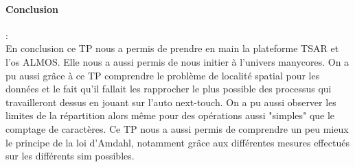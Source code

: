 \paragraph{Conclusion }:\\
En conclusion ce TP nous a permis de prendre en main la plateforme TSAR et l'os ALMOS. Elle nous a aussi permis de nous initier à l'univers manycores. On a pu aussi grâce à ce TP comprendre le problème de localité spatial pour les données et le fait qu'il fallait les rapprocher le plus possible des processus qui travailleront dessus en jouant sur l'auto next-touch. On a pu aussi observer les limites de la répartition alors même pour des opérations aussi "simples" que le comptage de caractères. Ce TP nous a aussi permis de comprendre un peu mieux le principe de la loi d'Amdahl, notamment grâce aux différentes mesures effectués sur les différents sim possibles.
